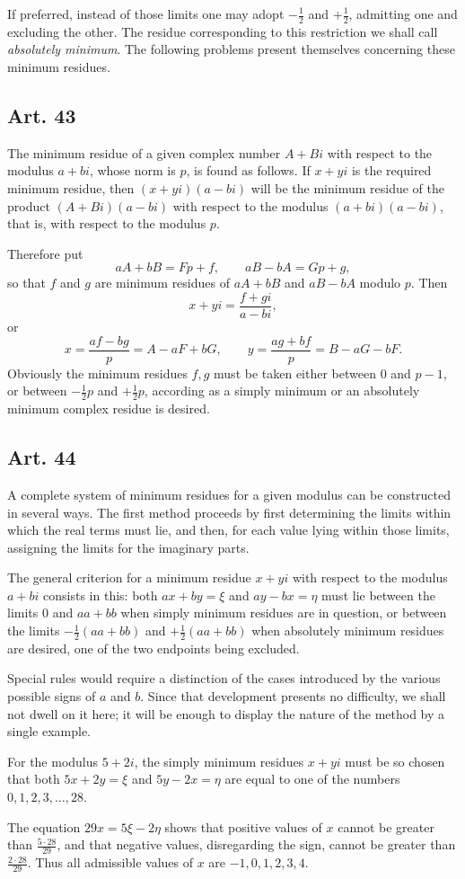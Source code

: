 \documentclass[12pt]{article}
\newcommand{\art}[1]{\subsection*{Art. #1}}
\begin{document}
If preferred, instead of those limits one may adopt $-\frac12$ and $+\frac12$, admitting one and excluding the other. The residue corresponding to this restriction we shall call \emph{absolutely minimum}. The following problems present themselves concerning these minimum residues.

\art{43}
The minimum residue of a given complex number $A+Bi$ with respect to the modulus $a+bi$, whose norm is $p$, is found as follows. If $x+yi$ is the required minimum residue, then $(x+yi)(a-bi)$ will be the minimum residue of the product $(A+Bi)(a-bi)$ with respect to the modulus $(a+bi)(a-bi)$, that is, with respect to the modulus $p$.

Therefore put
\[
aA+bB=Fp+f,\qquad aB-bA=Gp+g,
\]
so that $f$ and $g$ are minimum residues of $aA+bB$ and $aB-bA$ modulo $p$. Then
\[
x+yi=\frac{f+gi}{a-bi},
\]
or
\[
 x=\frac{af-bg}{p}=A-aF+bG,
\qquad
 y=\frac{ag+bf}{p}=B-aG-bF.
\]
Obviously the minimum residues $f,g$ must be taken either between $0$ and $p-1$, or between $-\frac12p$ and $+\frac12p$, according as a simply minimum or an absolutely minimum complex residue is desired.

\art{44}
A complete system of minimum residues for a given modulus can be constructed in several ways. The first method proceeds by first determining the limits within which the real terms must lie, and then, for each value lying within those limits, assigning the limits for the imaginary parts.

The general criterion for a minimum residue $x+yi$ with respect to the modulus $a+bi$ consists in this: both $ax+by=\xi$ and $ay-bx=\eta$ must lie between the limits $0$ and $aa+bb$ when simply minimum residues are in question, or between the limits $-\frac12(aa+bb)$ and $+\frac12(aa+bb)$ when absolutely minimum residues are desired, one of the two endpoints being excluded.

Special rules would require a distinction of the cases introduced by the various possible signs of $a$ and $b$. Since that development presents no difficulty, we shall not dwell on it here; it will be enough to display the nature of the method by a single example.

For the modulus $5+2i$, the simply minimum residues $x+yi$ must be so chosen that both $5x+2y=\xi$ and $5y-2x=\eta$ are equal to one of the numbers $0,1,2,3,\ldots,28$.

The equation $29x=5\xi-2\eta$ shows that positive values of $x$ cannot be greater than $\frac{5\cdot28}{29}$, and that negative values, disregarding the sign, cannot be greater than $\frac{2\cdot28}{29}$. Thus all admissible values of $x$ are $-1,0,1,2,3,4$.
\end{document}
